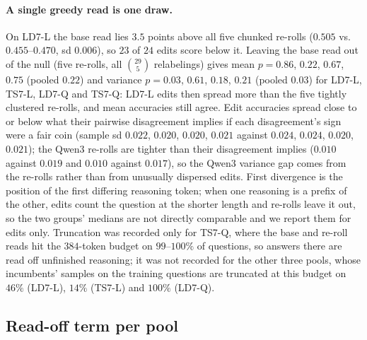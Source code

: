 \paragraph{A single greedy read is one draw.} On LD7-L the base read lies $3.5$ points above all
five chunked re-rolls ($0.505$ vs.\ $0.455$--$0.470$, sd $0.006$), so $23$ of $24$ edits score below
it. Leaving the base read out of the null (five re-rolls, all $\binom{29}{5}$ relabelings) gives mean
$p=0.86$, $0.22$, $0.67$, $0.75$ (pooled $0.22$) and variance $p=0.03$, $0.61$, $0.18$, $0.21$
(pooled $0.03$) for LD7-L, TS7-L, LD7-Q and TS7-Q: LD7-L edits then spread more than the five
tightly clustered re-rolls, and mean accuracies still agree. Edit accuracies spread close to or below what their
pairwise disagreement implies if each disagreement's sign were a fair coin (sample sd $0.022$,
$0.020$, $0.020$, $0.021$ against $0.024$, $0.024$, $0.020$, $0.021$); the Qwen3 re-rolls are
tighter than their disagreement implies ($0.010$ against $0.019$ and $0.010$ against $0.017$), so
the Qwen3 variance gap comes from the re-rolls rather than from unusually dispersed edits. First divergence
is the position of the first differing reasoning token; when one reasoning is a prefix of the
other, edits count the question at the shorter length and re-rolls leave it out, so the two
groups' medians are not directly comparable and we report them for edits only. Truncation was
recorded only for TS7-Q, where the base and re-roll reads hit the $384$-token budget on
$99$--$100\%$ of questions, so answers there are read off unfinished reasoning; it was not recorded
for the other three pools, whose incumbents' samples on the training questions are truncated at this
budget on $46\%$ (LD7-L), $14\%$ (TS7-L) and $100\%$ (LD7-Q).

\subsection{Read-off term per pool}

\begin{table}[h]
\centering
\caption{\textbf{The read-off term is small and unpredictive} (Eq.~\ref{eq:decomp}; eleven
pools; the incumbent's $16$ samples per training question, read under the incumbent and under
each candidate). Read-off flips: fraction of (candidate, question, sample) triples whose hard read
of the same reasoning changes; $|A|$: mean absolute read-off term per edit;
$|\Delta_{\text{held-out}}|$, $|\Delta_{\text{fresh}}|$: mean absolute change of held-out greedy
accuracy and of coupled fresh sampled accuracy on the training questions (accuracy points);
$\rho$: Spearman between $A$ and the held-out change; KL: median over edits of
$-\mathbb{E}_{\pi_P}\log w$ per reasoning (nats); sd$_x$: mean over edits of the within-question
standard deviation of $\log w$. Rows as in Table~\ref{tab:validity}; TS3-G: $A=0$ for every edit,
so $\rho$ is undefined.}
\label{tab:readoff}
\small

\end{table}

